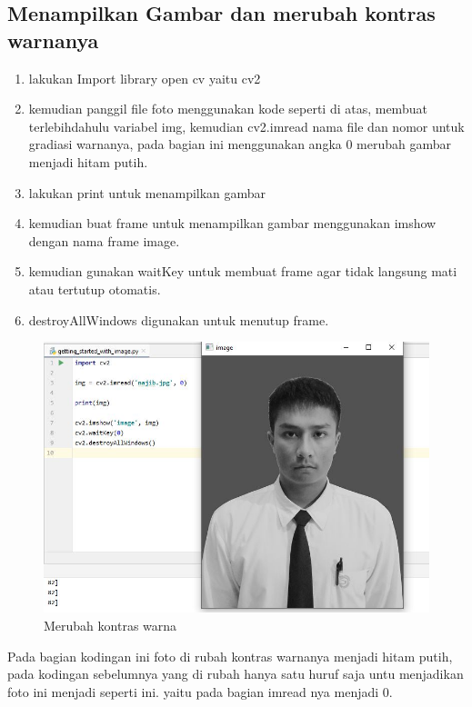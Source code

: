 \newpage
\subsection{Menampilkan Gambar dan merubah kontras warnanya}

\begin{enumerate}
	\item lakukan Import library open cv yaitu cv2
	\item kemudian panggil file foto menggunakan kode seperti di atas, membuat terlebihdahulu variabel img, kemudian cv2.imread nama file dan nomor untuk gradiasi warnanya, pada bagian ini menggunakan angka 0 merubah gambar menjadi hitam putih.
	\item lakukan print untuk menampilkan gambar
	\item kemudian buat frame untuk menampilkan gambar menggunakan imshow dengan nama frame image.
	\item kemudian gunakan waitKey untuk membuat frame agar tidak langsung mati atau tertutup otomatis.
	\item destroyAllWindows digunakan untuk menutup frame.
\end{enumerate}


\newpage
\begin{figure}[ht]
\centering
\includegraphics[scale=0.6]{figures/2,1.jpg}
\caption{Merubah kontras warna}
\label{contoh}
\end{figure}

Pada bagian kodingan ini foto di rubah kontras warnanya menjadi hitam putih, pada kodingan sebelumnya yang di rubah hanya satu huruf saja untu menjadikan foto ini menjadi seperti ini. yaitu pada bagian imread nya menjadi 0.

